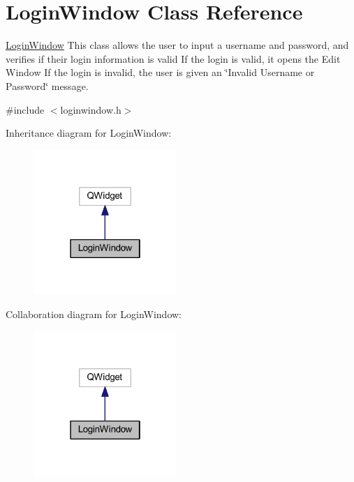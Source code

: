 \hypertarget{class_login_window}{}\section{Login\+Window Class Reference}
\label{class_login_window}


\mbox{\hyperlink{class_login_window}{Login\+Window}} This class allows the user to input a username and password, and verifies if their login information is valid If the login is valid, it opens the Edit Window If the login is invalid, the user is given an \char`\"{}\+Invalid Username or Password\char`\"{} message.  




{\ttfamily \#include $<$loginwindow.\+h$>$}



Inheritance diagram for Login\+Window\+:\nopagebreak
\begin{figure}[H]
\begin{center}
\leavevmode
\includegraphics[width=154pt]{class_login_window__inherit__graph}
\end{center}
\end{figure}


Collaboration diagram for Login\+Window\+:\nopagebreak
\begin{figure}[H]
\begin{center}
\leavevmode
\includegraphics[width=154pt]{class_login_window__coll__graph}
\end{center}
\end{figure}
